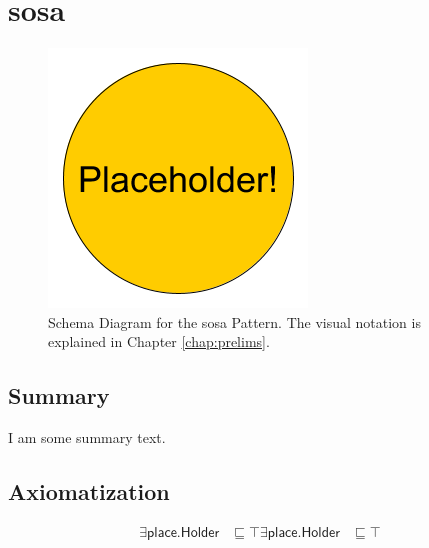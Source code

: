 \section{sosa}
\label{sec:sosa}
\begin{figure}[h!]
\begin{center}
\includegraphics[width=.8\textwidth]{figures/placeholder}
\end{center}
\caption{Schema Diagram for the sosa Pattern. The visual notation is explained in Chapter \ref{chap:prelims}.}
\label{fig:sosa}
\end{figure}
\subsection{Summary}
\label{sum:sosa}
I am some summary text.

\subsection{Axiomatization}
\label{axs:sosa}
\begin{align}
\exists\textsf{place.Holder} &\sqsubseteq \top 
\exists\textsf{place.Holder} &\sqsubseteq \top 
\end{align}

